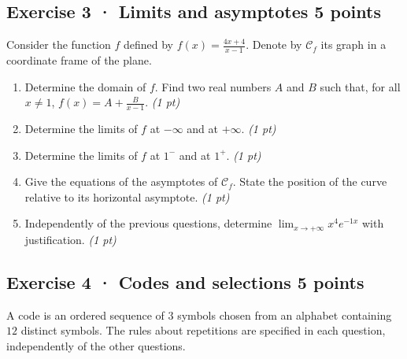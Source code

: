 \mxnewpage{}

\subsection*{Exercise 3 · Limits and asymptotes \hfill 5 points}Consider the function $f$ defined by $f(x)=\frac{4x+4}{x-1}$. Denote by $\mathcal C_f$ its graph in a coordinate frame of the plane.

\begin{enumerate}

\item Determine the domain of $f$. Find two real numbers $A$ and $B$ such that, for all $x\ne1$, $f(x)=A+\frac B{x-1}$. \hfill\textit{(1 pt)}

\item Determine the limits of $f$ at $-\infty$ and at $+\infty$. \hfill\textit{(1 pt)}

\item Determine the limits of $f$ at $1^-$ and at $1^+$. \hfill\textit{(1 pt)}

\item Give the equations of the asymptotes of $\mathcal C_f$. State the position of the curve relative to its horizontal asymptote. \hfill\textit{(1 pt)}

\item Independently of the previous questions, determine $\displaystyle\lim_{x\to+\infty}x^{4}e^{-1x}$ with justification. \hfill\textit{(1 pt)}

\end{enumerate}

\subsection*{Exercise 4 · Codes and selections \hfill 5 points}A code is an ordered sequence of $3$ symbols chosen from an alphabet containing $12$ distinct symbols. The rules about repetitions are specified in each question, independently of the other questions.

